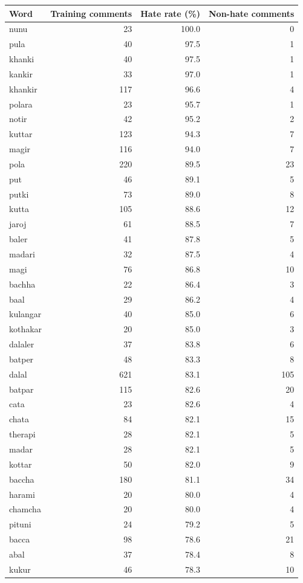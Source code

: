 \begin{tabular}{lrrr}
\toprule
Word & Training comments & Hate rate (\%) & Non-hate comments \\
\midrule
nunu & 23 & 100.0 & 0 \\
pula & 40 & 97.5 & 1 \\
khanki & 40 & 97.5 & 1 \\
kankir & 33 & 97.0 & 1 \\
khankir & 117 & 96.6 & 4 \\
polara & 23 & 95.7 & 1 \\
notir & 42 & 95.2 & 2 \\
kuttar & 123 & 94.3 & 7 \\
magir & 116 & 94.0 & 7 \\
pola & 220 & 89.5 & 23 \\
put & 46 & 89.1 & 5 \\
putki & 73 & 89.0 & 8 \\
kutta & 105 & 88.6 & 12 \\
jaroj & 61 & 88.5 & 7 \\
baler & 41 & 87.8 & 5 \\
madari & 32 & 87.5 & 4 \\
magi & 76 & 86.8 & 10 \\
bachha & 22 & 86.4 & 3 \\
baal & 29 & 86.2 & 4 \\
kulangar & 40 & 85.0 & 6 \\
kothakar & 20 & 85.0 & 3 \\
dalaler & 37 & 83.8 & 6 \\
batper & 48 & 83.3 & 8 \\
dalal & 621 & 83.1 & 105 \\
batpar & 115 & 82.6 & 20 \\
cata & 23 & 82.6 & 4 \\
chata & 84 & 82.1 & 15 \\
therapi & 28 & 82.1 & 5 \\
madar & 28 & 82.1 & 5 \\
kottar & 50 & 82.0 & 9 \\
baccha & 180 & 81.1 & 34 \\
harami & 20 & 80.0 & 4 \\
chamcha & 20 & 80.0 & 4 \\
pituni & 24 & 79.2 & 5 \\
bacca & 98 & 78.6 & 21 \\
abal & 37 & 78.4 & 8 \\
kukur & 46 & 78.3 & 10 \\

\end{tabular}
